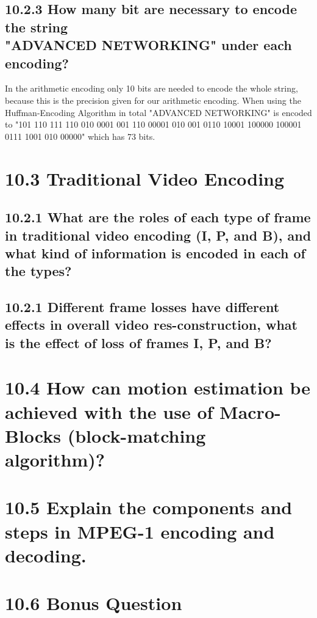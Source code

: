 \documentclass{article}
\begin{document}
\begin{adjustwidth}{2em}{2em}
		\subsection*{10.2.3 How many bit are necessary to encode the string \\ "ADVANCED NETWORKING" under each encoding?}
		\begin{adjustwidth}{2em}{2em}
			In the arithmetic encoding only 10 bits are needed to encode the whole string, because this is the precision given for our arithmetic encoding. When using the Huffman-Encoding Algorithm in total "ADVANCED NETWORKING" is encoded to "101 110 111 110 010 0001 001 110 00001 010 001 0110 10001 100000 100001 0111 1001 010 00000" which has 73 bits.
		\end{adjustwidth}
	\end{adjustwidth}
	
	\section*{10.3 Traditional Video Encoding}
	\begin{adjustwidth}{2em}{2em}
		\subsection*{10.2.1 What are the roles of each type of frame in traditional video encoding (I, P, and B), and what kind of information is encoded in each of the types?}
		\begin{adjustwidth}{2em}{2em}
		\end{adjustwidth}
		\subsection*{10.2.1 Different frame losses have different effects in overall video res-construction, what is the effect of loss of frames I, P, and B?}
		\begin{adjustwidth}{2em}{2em}
		\end{adjustwidth}
	\end{adjustwidth}
	
	\section*{10.4 How can motion estimation be achieved with the use of Macro-Blocks (block-matching algorithm)?}
	\begin{adjustwidth}{2em}{2em}
	\end{adjustwidth}
	
	\section*{10.5 Explain the components and steps in MPEG-1 encoding and decoding.}
	\begin{adjustwidth}{2em}{2em}
	\end{adjustwidth}
	
	\section*{10.6 Bonus Question}
	\begin{adjustwidth}{2em}{2em}
	\end{adjustwidth}
\end{document}
